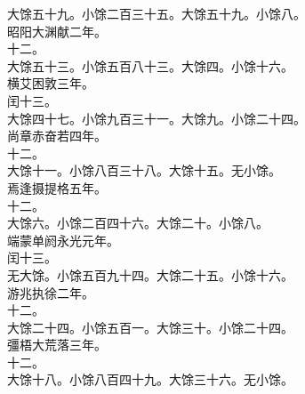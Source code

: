 \documentclass{zhvt-classic}
\begin{document}
\hspace*{2em}大馀五十九。小馀二百三十五。大馀五十九。小馀八。\\
\hspace*{2em}昭阳大渊献二年。\\
\hspace*{2em}十二。\\
\hspace*{2em}大馀五十三。小馀五百八十三。大馀四。小馀十六。\\
\hspace*{2em}横艾困敦三年。\\
\hspace*{2em}闰十三。\\
\hspace*{2em}大馀四十七。小馀九百三十一。大馀九。小馀二十四。\\
\hspace*{2em}尚章赤奋若四年。\\
\hspace*{2em}十二。\\
\hspace*{2em}大馀十一。小馀八百三十八。大馀十五。无小馀。\\
\hspace*{2em}焉逢摄提格五年。\\
\hspace*{2em}十二。\\
\hspace*{2em}大馀六。小馀二百四十六。大馀二十。小馀八。\\
\hspace*{2em}端蒙单阏永光元年。\\
\hspace*{2em}闰十三。\\
\hspace*{2em}无大馀。小馀五百九十四。大馀二十五。小馀十六。\\
\hspace*{2em}游兆执徐二年。\\
\hspace*{2em}十二。\\
\hspace*{2em}大馀二十四。小馀五百一。大馀三十。小馀二十四。\\
\hspace*{2em}彊梧大荒落三年。\\
\hspace*{2em}十二。\\
\hspace*{2em}大馀十八。小馀八百四十九。大馀三十六。无小馀。\\
\end{document}
